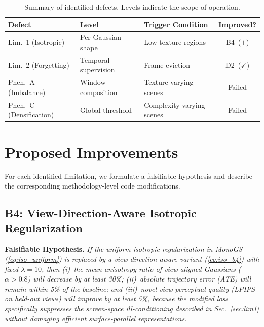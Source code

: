 \documentclass[conference]{IEEEtran}
\begin{document}
\begin{table}[htbp]
\caption{Summary of identified defects. Levels indicate the scope of operation.}
\label{tab:defect_summary}
\begin{center}
\small
\setlength{\tabcolsep}{3pt}
\begin{tabular}{|>{\centering\arraybackslash}m{56pt}|>{\centering\arraybackslash}m{60pt}|>{\centering\arraybackslash}m{65pt}|c|}
\hline
\textbf{Defect} & \textbf{Level} & \textbf{Trigger Condition} & \textbf{Improved?} \\
\hline
Lim.~1 (Isotropic) & Per-Gaussian shape & Low-texture regions & {B4}~($\pm$) \\
\hline
Lim.~2 (Forgetting) & Temporal supervision & Frame eviction & {D2}~($\checkmark$) \\
\hline
Phen.~A (Imbalance) & Window composition & Texture-varying scenes & Failed \\
\hline
Phen.~C (Densification) & Global threshold & Complexity-varying scenes & Failed \\
\hline
\end{tabular}
\end{center}
\end{table}

\section{Proposed Improvements}
\label{sec:improvements}

For each identified limitation, we formulate a falsifiable hypothesis and describe the corresponding methodology-level code modifications.

\subsection{{B4}: View-Direction-Aware Isotropic Regularization}
\label{sec:b4}

\textbf{Falsifiable Hypothesis.}
\textit{If the uniform isotropic regularization in MonoGS (\eqref{eq:iso_uniform}) is replaced by a view-direction-aware variant (\eqref{eq:iso_b4}) with fixed $\lambda=10$, then (i)~the mean anisotropy ratio of view-aligned Gaussians ($\alpha > 0.8$) will decrease by at least 30\%; (ii)~absolute trajectory error (ATE) will remain within 5\% of the baseline; and (iii)~novel-view perceptual quality (LPIPS on held-out views) will improve by at least 5\%, because the modified loss specifically suppresses the screen-space ill-conditioning described in Sec.~\ref{sec:lim1} without damaging efficient surface-parallel representations.}
\end{document}
